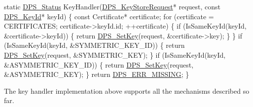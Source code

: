 \begin{DoxyCodeInclude}
\textcolor{keyword}{static} \hyperlink{group__status_ga30395a84d3cad9d4ec29848106415038}{DPS\_Status} KeyHandler(\hyperlink{group__keystore_ga7c3e50965b65334e9791780fa855ed16}{DPS\_KeyStoreRequest}* request, \textcolor{keyword}{const} 
      \hyperlink{struct___d_p_s___key_id}{DPS\_KeyId}* keyId)
\{
    \textcolor{keyword}{const} Certificate* certificate;
    \textcolor{keywordflow}{for} (certificate = CERTIFICATES; certificate->keyId.id; ++certificate) \{
        \textcolor{keywordflow}{if} (IsSameKeyId(keyId, &certificate->keyId)) \{
            \textcolor{keywordflow}{return} \hyperlink{group__keystore_ga15d6a9b8256b67c2ec8b1d365a98dbab}{DPS\_SetKey}(request, &certificate->key);
        \}
    \}
    \textcolor{keywordflow}{if} (IsSameKeyId(keyId, &SYMMETRIC\_KEY\_ID)) \{
        \textcolor{keywordflow}{return} \hyperlink{group__keystore_ga15d6a9b8256b67c2ec8b1d365a98dbab}{DPS\_SetKey}(request, &SYMMETRIC\_KEY);
    \}
    \textcolor{keywordflow}{if} (IsSameKeyId(keyId, &ASYMMETRIC\_KEY\_ID)) \{
        \textcolor{keywordflow}{return} \hyperlink{group__keystore_ga15d6a9b8256b67c2ec8b1d365a98dbab}{DPS\_SetKey}(request, &ASYMMETRIC\_KEY);
    \}
    \textcolor{keywordflow}{return} \hyperlink{group__status_ga5c46980c33492a8b76bffce081dbcba4}{DPS\_ERR\_MISSING};
\}
\end{DoxyCodeInclude}
The key handler implementation above supports all the mechanisms described so far.


